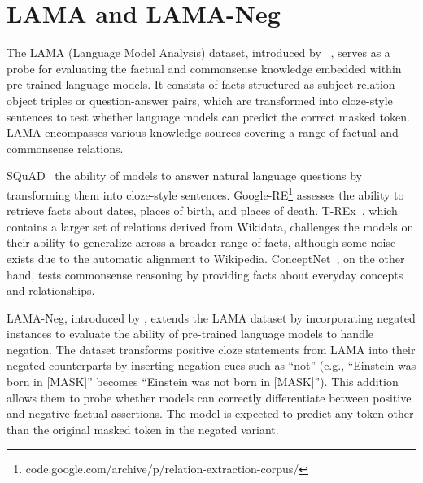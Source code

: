 \section{LAMA and LAMA-Neg}
\label{app:lama}

The LAMA (Language Model Analysis) dataset, introduced by ~\citet{petroni-etal-2019-language},
serves as a probe for evaluating the factual and commonsense knowledge embedded within pre-trained language models. 
It consists of facts structured as subject-relation-object triples or question-answer pairs, 
which are transformed into cloze-style sentences to test whether language models can predict the correct masked token. 
LAMA encompasses various knowledge sources covering a range of factual and commonsense relations.

SQuAD~\cite{rajpurkar-etal-2016-squad} the ability of models to answer natural language questions by transforming them into cloze-style sentences.
Google-RE\footnote{\footnotesize {code.google.com/archive/p/relation-extraction-corpus/}} 
assesses the ability to retrieve facts about dates, places of birth, and places of death. 
T-REx~\cite{elsahar-etal-2018-rex}, 
which contains a larger set of relations derived from Wikidata, challenges the models on their ability to generalize across a broader range of facts, 
although some noise exists due to the automatic alignment to Wikipedia. 
ConceptNet~\cite{speer-havasi-2012-representing}, 
on the other hand, tests commonsense reasoning by providing facts about everyday concepts and relationships.

LAMA-Neg, introduced by \citet{kassner-schutze-2020-negated},
extends the LAMA dataset by incorporating negated instances to evaluate the ability of pre-trained language models to handle negation. 
The dataset transforms positive cloze statements from LAMA into their negated counterparts by inserting negation cues such as “not” 
(e.g., “Einstein was born in [MASK]” becomes “Einstein was not born in [MASK]”). 
This addition allows them to probe whether models can correctly differentiate between positive and negative factual assertions.
The model is expected to predict any token other than the original masked token in the negated variant.